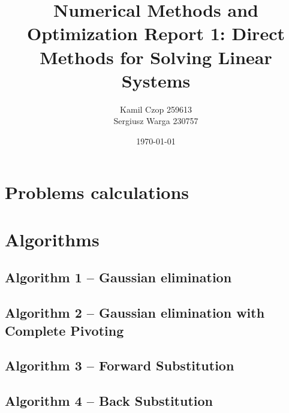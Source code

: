 \documentclass[a4paper]{article}
\title{Numerical Methods and Optimization Report 1: Direct Methods for Solving Linear Systems}
\author{Kamil Czop 259613\\Sergiusz Warga 230757}
\date{\today}
\begin{document}
\maketitle
\tableofcontents
\pagebreak


\section{Problems calculations}






% 

\section{Algorithms}
\subsection{Algorithm 1 -- Gaussian elimination}\label{algorithm:1}

\subsection{Algorithm 2 -- Gaussian  elimination  with  Complete  Pivoting}\label{algorithm:2}

\subsection{Algorithm 3 -- Forward Substitution}\label{algorithm:3}

\subsection{Algorithm 4 -- Back Substitution}\label{algorithm:4}

\end{document}
